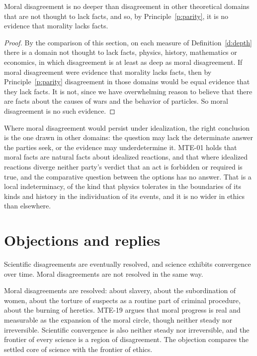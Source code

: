\documentclass{situationist-preprint}
\begin{document}
\begin{theorem}\label{t:main}
Moral disagreement is no deeper than disagreement in other theoretical domains that are not thought to lack facts, and so, by Principle~\ref{p:parity}, it is no evidence that morality lacks facts.
\end{theorem}

\begin{proof}
By the comparison of this section, on each measure of Definition~\ref{d:depth} there is a domain not thought to lack facts, physics, history, mathematics or economics, in which disagreement is at least as deep as moral disagreement. If moral disagreement were evidence that morality lacks facts, then by Principle~\ref{p:parity} disagreement in those domains would be equal evidence that they lack facts. It is not, since we have overwhelming reason to believe that there are facts about the causes of wars and the behavior of particles. So moral disagreement is no such evidence.
\end{proof}

Where moral disagreement would persist under idealization, the right conclusion is the one drawn in other domains: the question may lack the determinate answer the parties seek, or the evidence may underdetermine it. MTE-01 holds that moral facts are natural facts about idealized reactions, and that where idealized reactions diverge neither party's verdict that an act is forbidden or required is true, and the comparative question between the options has no answer. That is a local indeterminacy, of the kind that physics tolerates in the boundaries of its kinds and history in the individuation of its events, and it is no wider in ethics than elsewhere.

\section{Objections and replies}\label{s:obj}

\begin{objection}
Scientific disagreements are eventually resolved, and science exhibits convergence over time. Moral disagreements are not resolved in the same way.
\end{objection}

\begin{reply}
Moral disagreements are resolved: about slavery, about the subordination of women, about the torture of suspects as a routine part of criminal procedure, about the burning of heretics. MTE-19 argues that moral progress is real and measurable as the expansion of the moral circle, though neither steady nor irreversible. Scientific convergence is also neither steady nor irreversible, and the frontier of every science is a region of disagreement. The objection compares the settled core of science with the frontier of ethics.
\end{reply}
\end{document}
